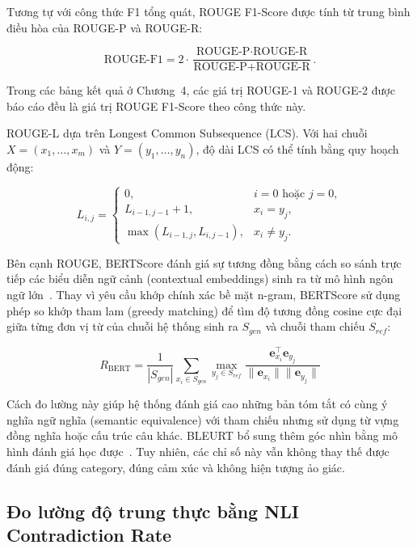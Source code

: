 Tương tự với công thức F1 tổng quát, ROUGE F1-Score được tính từ trung bình điều hòa của ROUGE-P và ROUGE-R:

\begin{equation}
\text{ROUGE-F1} = 2 \cdot \frac{\text{ROUGE-P} \cdot \text{ROUGE-R}}{\text{ROUGE-P} + \text{ROUGE-R}}.
\label{eq:chap2-rouge-f1}
\end{equation}

Trong các bảng kết quả ở Chương~4, các giá trị ROUGE-1 và ROUGE-2 được báo cáo đều là giá trị ROUGE F1-Score theo công thức này.

ROUGE-L dựa trên Longest Common Subsequence (LCS). Với hai chuỗi $X=(x_1,\ldots,x_m)$ và $Y=(y_1,\ldots,y_n)$, độ dài LCS có thể tính bằng quy hoạch động:

\begin{equation}
L_{i,j}=\begin{cases}
0, & i=0 \text{ hoặc } j=0,\\
L_{i-1,j-1}+1, & x_i=y_j,\\
\max(L_{i-1,j},L_{i,j-1}), & x_i\neq y_j.
\end{cases}
\label{eq:chap2-lcs}
\end{equation}

Bên cạnh ROUGE, BERTScore đánh giá sự tương đồng bằng cách so sánh trực tiếp các biểu diễn ngữ cảnh (contextual embeddings) sinh ra từ mô hình ngôn ngữ lớn~\cite{zhang2020bertscore}. Thay vì yêu cầu khớp chính xác bề mặt n-gram, BERTScore sử dụng phép so khớp tham lam (greedy matching) để tìm độ tương đồng cosine cực đại giữa từng đơn vị từ của chuỗi hệ thống sinh ra $S_{gen}$ và chuỗi tham chiếu $S_{ref}$:

\begin{equation}
R_{\text{BERT}} = \frac{1}{|S_{gen}|} \sum_{x_i \in S_{gen}} \max_{y_j \in S_{ref}} \frac{\mathbf{e}_{x_i}^\top \mathbf{e}_{y_j}}{\|\mathbf{e}_{x_i}\| \|\mathbf{e}_{y_j}\|}
\label{eq:dev-chap2-bertscore-recall}
\end{equation}

Cách đo lường này giúp hệ thống đánh giá cao những bản tóm tắt có cùng ý nghĩa ngữ nghĩa (semantic equivalence) với tham chiếu nhưng sử dụng từ vựng đồng nghĩa hoặc cấu trúc câu khác. BLEURT bổ sung thêm góc nhìn bằng mô hình đánh giá học được~\cite{sellam2020bleurt}. Tuy nhiên, các chỉ số này vẫn không thay thế được đánh giá đúng category, đúng cảm xúc và không hiện tượng ảo giác.

\subsection{Đo lường độ trung thực bằng NLI Contradiction Rate}
\label{subsec:dev-chap2-nli-eval}

